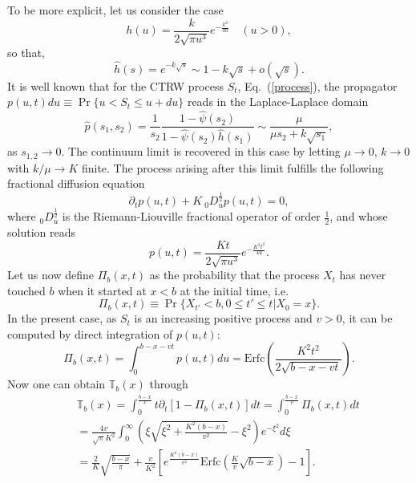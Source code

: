 \documentclass[english,aps,a4paper,twocolumn,showpacs,showkeys,amsfonts,amsmath,amssymb,amscd,nofootinbib]{revtex4}
\newcommand{\1}{\'\i}
\newcommand{\TT}{\mathbb{T}}\newcommand{\FF}{\mathbb{F}}
\begin{document}
To be more explicit, let us consider the case
\begin{equation}
h(u)=\frac{k}{2 \sqrt{\pi u^3}} e^{-\frac{k^2}{4 u}}\quad (u>0),
\end{equation}
so that,
\begin{equation}
\hat h(s)=e^{-k \sqrt{s}}\sim 1-k \sqrt{s} +o(\sqrt{s}).
\end{equation}
It is well known that for the CTRW process $S_t$, Eq.~(\ref{process}), the %
propagator 
$p(u,t)du\equiv\Pr\{u<S_t\leqslant u+du\}$ reads in the Laplace-Laplace domain
\begin{equation}
\hat p(s_1,s_2)=  \frac{1}{s_2}\frac{1-\hat{\psi}(s_2)}{1-\hat{\psi}(s_2)\hat{h}(s_1)}\sim\frac{\mu}{\mu s_2+k \sqrt{s_1}},
\end{equation}
as $s_{1,2}\to 0$. The continuum limit is recovered in this case by letting $\mu \to 0$, $k \to 0$ with $k/\mu \to K$ finite. The process arising after this limit fulfills the following fractional diffusion equation
\begin{equation}
\partial_t p(u,t) + K\ { }^{}_0 D_u^{\frac{1}{2}} p(u,t)=0, 
\end{equation}
where ${ }^{}_0 D_u^{\frac{1}{2}}$ is the Riemann-Liouville fractional operator of order $\frac{1}{2}$, and whose solution reads
\begin{equation}
p(u,t)=\frac{K t}{2 \sqrt{\pi u^3}} e^{-\frac{K^2 t^2}{4 u}}.
\end{equation}
Let us now define $\Pi_b(x,t)$ as the probability that the process $X_t$ has never touched $b$ when it started at $x< b$ at the initial time, i.e.  
\begin{equation}
\Pi_b(x,t)\equiv\Pr\{X_{t'}< b, 0\leqslant t' \leqslant t |X_0=x\}.
\end{equation}
In the present case, as $S_t$ is an increasing positive process and $v>0$, it can be computed by direct integration of $p(u,t)$: 
\begin{equation}
\Pi_b(x,t)=\int_0^{b-x-vt} p(u,t) du=\text{Erfc}\left(\frac{K^2 t^2}{2\sqrt{b-x-vt}}\right).
\end{equation}
Now one can obtain $\TT_b(x)$ through
\begin{eqnarray}
&&\TT_b(x)=\int_{0}^{\frac{b-x}{v}} t \partial_t\left[1- \Pi_b(x,t)\right] dt=\int_{0}^{\frac{b-x}{v}} \Pi_b(x,t) dt\nonumber\\
&&=\frac{4v}{\sqrt{\pi}K^2}\int_0^{\infty}\left(\xi \sqrt{\xi^2+\frac{K^2(b-x)}{v^2}}-\xi^2\right) e^{-\xi^2}d\xi \nonumber \\
&&=\frac{2}{K}\sqrt{\frac{b-x}{\pi}}+ \frac{v}{K^2} \left[ e^{\frac{K^2(b-x)}{v^2}}\text{Erfc}\left(\frac{K}{v}\sqrt{b-x}\right)-1\right]. \nonumber \\ \label{Ex_TTb}
\end{eqnarray}
 
\end{document}
